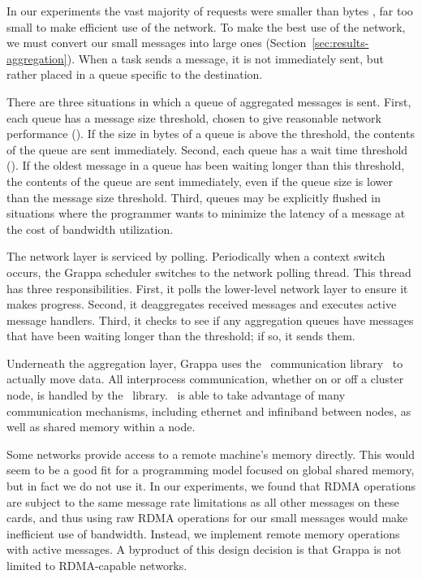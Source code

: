 In our experiments the vast majority of requests were smaller than
 bytes , far too small to make
efficient use of the network. To make the best use of the network, we
must convert our small messages into large ones
(Section~\ref{sec:results-aggregation}).  When a task sends a message,
it is not immediately sent, but rather placed in a queue specific to the
destination.

There are three situations in which a queue of aggregated messages is
sent. First, each queue has a message size threshold, chosen to give
reasonable network performance (). If the size in
bytes of a queue is above the threshold, the contents of the queue are
sent immediately. Second, each queue has a wait time threshold
(). If the oldest message in a queue has been waiting
longer than this threshold, the contents of the queue are sent
immediately, even if the queue size is lower than the message size
threshold.  Third, queues may be explicitly flushed in situations where
the programmer wants to minimize the latency of a message at the cost of
bandwidth utilization.

The network layer is serviced by polling. Periodically when a context
switch occurs, the Grappa scheduler switches to the network polling
thread. This thread has three responsibilities. First, it polls the
lower-level network layer to ensure it makes progress. Second, it
deaggregates received messages and executes active message
handlers. Third, it checks to see if any aggregation queues have
messages that have been waiting longer than the threshold; if so, it
sends them.

Underneath the aggregation layer, Grappa uses the \gasnet~communication
library~\cite{gasnet} to actually move data. All interprocess
communication, whether on or off a cluster node, is handled by the
\gasnet~library. \gasnet~is able to take advantage of many communication
mechanisms, including ethernet and infiniband between nodes, as well as
shared memory within a node.

Some networks provide access to a remote machine's memory directly. This
would seem to be a good fit for a programming model focused on global
shared memory, but in fact we do not use it. In our experiments, we
found that RDMA operations are subject to the same message rate
limitations as all other messages on these cards, and thus using raw
RDMA operations for our small messages would make inefficient use of
bandwidth. Instead, we implement remote memory operations with active
messages. A byproduct of this design decision is that Grappa is not
limited to RDMA-capable networks.
